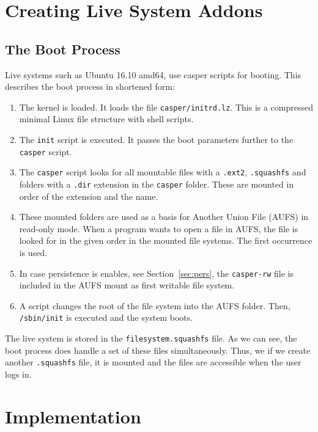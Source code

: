 \documentclass[english]{lni}
\begin{document}
\section{Creating Live System Addons}
\label{sec:live}


\subsection{The Boot Process}
\label{sec:boot}
Live systems such as Ubuntu 16.10 amd64, use casper scripts for booting.
This describes the boot process in shortened form:
\begin{enumerate}
  \item The kernel is loaded.
        It loads the file \texttt{casper/initrd.lz}.
        This is a compressed minimal Linux file structure with shell scripts.
  \item The \texttt{init} script is executed.
        It passes the boot parameters further to the \texttt{casper} script.
  \item The \texttt{casper} script looks for all mountable files with a \texttt{.ext2}, \texttt{.squashfs} and folders with a \texttt{.dir} extension in the \texttt{casper} folder.
        These are mounted in order of the extension and the name.
  \item These mounted folders are used as a basis for Another Union File (AUFS) in read-only mode.
        When a program wants to open a file in AUFS, the file is looked for in the given order in the mounted file systems.
        The first occurrence is used.
  \item In case persistence is enables, see Section~\ref{sec:pers}, the \texttt{casper-rw} file is included in the AUFS mount as first writable file system.
  \item A script changes the root of the file system into the AUFS folder.
        Then, \texttt{/sbin/init} is executed and the system boots.
\end{enumerate}

The live system is stored in the \texttt{filesystem.squashfs} file.
As we can see, the boot process does handle a set of these files simultaneously.
Thus, we if we create another \texttt{.squashfs} file, it is mounted and the files are accessible when the user logs in.

\section{Implementation}
\end{document}
